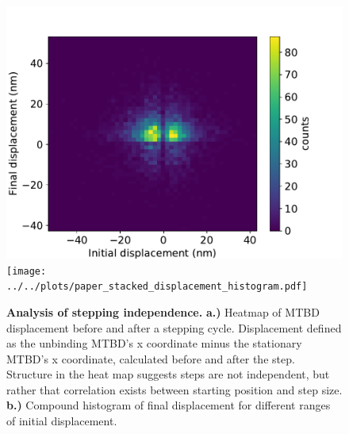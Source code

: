 \documentclass[9pt,twocolumn,twoside]{article}
\begin{document}
\begin{figure}[tbhp]
  \centering
  \includegraphics[width=\linewidth]{../../plots/paper_initial_vs_final_displacement.pdf}\\
  \texttt{[image: ../../plots/paper\_stacked\_displacement\_histogram.pdf]}
  \caption{\textbf{Analysis of stepping independence.} \textbf{a.)} Heatmap of MTBD displacement before and after a stepping cycle. Displacement defined as the unbinding MTBD's x coordinate minus the stationary MTBD's x coordinate, calculated before and after the step. Structure in the heat map suggests steps are not independent, but rather that correlation exists between starting position and step size. \textbf{b.)} Compound histogram of final displacement for different ranges of initial displacement.}
\label{fig:independence}
\end{figure}
\end{document}
